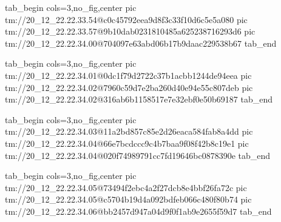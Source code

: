  
 
 
 
 

\qqSecCmtScr


\ifcmt
  tab_begin cols=3,no_fig,center
    pic tm://20_12_22.22.33.54@c0c45792eea9d8f3c33f10d6c5e5a080
    pic tm://20_12_22.22.33.57@9b10dab0231810485a625238716293d6
    pic tm://20_12_22.22.34.00@704097e63abd06b17b9daac229538b67
  tab_end
\fi


\ifcmt
  tab_begin cols=3,no_fig,center
    pic tm://20_12_22.22.34.01@0dc1f79d2722c37b1acbb1244de94eea
    pic tm://20_12_22.22.34.02@7960c59d7e2ba260d40e94e55c807deb
    pic tm://20_12_22.22.34.02@316ab6b1158517e7e32ebf0e50b69187
  tab_end
\fi


\ifcmt
  tab_begin cols=3,no_fig,center
    pic tm://20_12_22.22.34.03@11a2bd857c85e2d26eaca584fab8a4dd
    pic tm://20_12_22.22.34.04@66e7bcdccc9c4b7baa9f08f42b8c19e1
    pic tm://20_12_22.22.34.04@020f74989791cc7fd19646bc0878390e
  tab_end
\fi


\ifcmt
  tab_begin cols=3,no_fig,center
    pic tm://20_12_22.22.34.05@73494f2ebc4a2f27dcb8e4bbf26fa72c
    pic tm://20_12_22.22.34.05@c5704b19d4a092bdfeb066c480f80b74
    pic tm://20_12_22.22.34.06@bb2457d947a04d9f0f1ab9e2655f59d7
  tab_end
\fi

